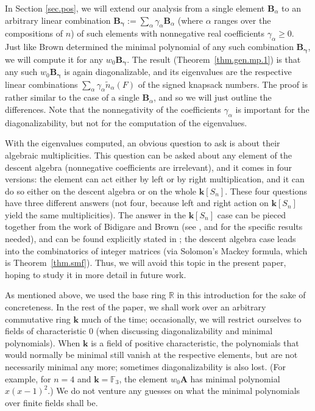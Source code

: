 \documentclass[12pt]{article}
\theoremstyle{definition}%
\theoremstyle{definition}%
\theoremstyle{remark}%
\newcommand{\tup}[1]{\left( #1 \right)}
\newcommand{\RR}{\mathbb{R}}
\newcommand{\kk}{\mathbf{k}}
\newcommand{\ksn}{\kk\left[S_n\right]}
\newcommand{\A}{\mathbf{A}}
\newcommand{\BB}{\mathbf{B}}
\newcommand{\BBa}{\mathbf{B}_{\alpha}}
\newcommand{\bgamma}{\bm{\gamma}}
\newcommand{\wo}{w_0} %
\newcommand{\nna}{\widetilde{n}_{ \alpha } }%
\begin{document}
In Section \ref{sec.pos}, we will extend our analysis from a single element $\BBa$ to an arbitrary linear combination $\BB_{\bgamma} := \sum_{\alpha} \gamma_\alpha \BBa$ (where $\alpha$ ranges over the compositions of $n$) of such elements with nonnegative real coefficients $\gamma_\alpha \geq 0$.
Just like Brown determined the minimal polynomial of any such combination $\BB_{\bgamma}$, we will compute it for any $\wo \BB_{\bgamma}$.
The result (Theorem~\ref{thm.gen.mp.1}) is that any such $\wo \BB_{\bgamma}$ is again diagonalizable, and its eigenvalues are the respective linear combinations $\sum_{\alpha} \gamma_\alpha \nna\tup{F}$ of the signed knapsack numbers.
The proof is rather similar to the case of a single $\BBa$, and so we will just outline the differences.
Note that the nonnegativity of the coefficients $\gamma_\alpha$ is important for the diagonalizability, but not for the computation of the eigenvalues.

With the eigenvalues computed, an obvious question to ask is about their algebraic multiplicities.
This question can be asked about any element of the descent algebra (nonnegative coefficients are irrelevant), and it comes in four versions: the element can act either by left or by right multiplication, and it can do so either on the descent algebra or on the whole $\ksn$.
These four questions have three different answers (not four, because left and right action on $\ksn$ yield the same multiplicities).
The answer in the $\ksn$ case can be pieced together from the work of Bidigare \cite[Sections 3.8 and 4.1]{Bidigare-thesis} and Brown \cite[Appendix B]{Brown-Methods} (see \cite[Theorem 1.2]{dc2023}, \cite[Proposition 4.2]{ReSaWe14} and \cite[Corollary 4.1.3]{Bidigare-thesis} for the specific results needed), and can be found explicitly stated in \cite[Corollary 4 and Proposition 4]{GriVas26};
the descent algebra case leads into the combinatorics of integer matrices (via Solomon's Mackey formula, which is Theorem~\ref{thm.smf}). %
Thus, we will avoid this topic in the present paper, hoping to study it in more detail in future work.

As mentioned above, we used the base ring $\RR$ in this introduction for the sake of concreteness.
In the rest of the paper, we shall work over an arbitrary commutative ring $\kk$ much of the time; occasionally, we will restrict ourselves to fields of characteristic $0$ (when discussing diagonalizability and minimal polynomials).
When $\kk$ is a field of positive characteristic, the polynomials that would normally be minimal still vanish at the respective elements, but are not necessarily minimal any more; sometimes diagonalizability is also lost.
(For example, for $n = 4$ and $\kk = \mathbb{F}_3$, the element $\wo\A$ has minimal polynomial $x\tup{x-1}^2$.)
We do not venture any guesses on what the minimal polynomials over finite fields shall be.
\end{document}
